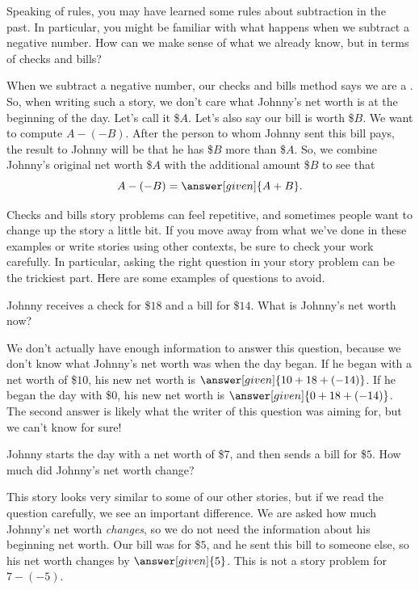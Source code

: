 \documentclass{ximera}
\begin{document}
Speaking of rules, you may have learned some rules about subtraction in the past.  In particular, you might be familiar 
with what happens when we subtract a negative number.  How can we make sense of what we already know, 
but in terms of checks and bills?
\begin{example}
When we subtract a negative number, our checks and bills method says we are 
 a 
.  So, when writing such a story, we don't care what 
Johnny's net worth is at the beginning of the day.  Let's call it \$$A$.  Let's also say our bill is 
worth \$$B$.  We want to compute $A - (-B)$.  After the person to whom Johnny sent this bill pays, 
the result to Johnny will be that he has \$$B$ more than \$$A$.  So, we combine Johnny's original net 
worth \$$A$ with the additional amount \$$B$ to see that
\[
A - (-B) = \answer[given]{A + B}.
\]
\end{example}


Checks and bills story problems can feel repetitive, and sometimes people want to change up the story a little bit. If you move away from what we've done in these examples or write stories using other contexts, be sure to check your work carefully. In particular, asking the right question in your story problem can be the trickiest part. Here are some examples of questions to avoid.

\begin{example}
Johnny receives a check for \$$18$ and a bill for \$$14$.  What is Johnny's net worth now?
\begin{explanation}
We don't actually have enough information to answer this question, because we don't know what Johnny's net worth was when the day began.  If he began with a net worth of \$$10$, his new net worth is $\answer[given]{10 + 18 + (-14)}$.  If he began the day with \$$0$, his new net worth is $\answer[given]{0 + 18 + (-14)}$.  The second answer is likely what the writer of this question was aiming for, but we can't know for sure!
\end{explanation}
\end{example}

\begin{example}
Johnny starts the day with a net worth of \$$7$, and then sends a bill for \$$5$.  How much 
did Johnny's net worth change?
\begin{explanation}
This story looks very similar to some of our other stories, but if we read the question 
carefully, we see an important difference.  We are asked how much Johnny's net worth 
{\em changes}, so we do not need the information about his beginning net worth.  Our bill was for 
\$$5$, and he sent this bill to someone else, so his net worth changes by $\answer[given]{5}$.  
This is not a story problem for $7 - (-5)$.
\end{explanation}
\end{example}
\end{document}
